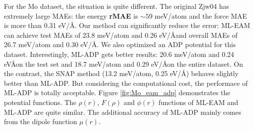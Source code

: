 \documentclass[prb,reprint,superscriptaddress]{revtex4-2}
\begin{document}
For the Mo dataset, the situation is quite different. The original Zjw04 has 
extremely large MAEs: the energy \textbf{rMAE} is $\sim 59$ meV/atom and the 
force MAE is more than 0.31 eV/\AA. Our method can significantly reduce the 
error: ML-EAM can achieve test MAEs of 23.8 meV/atom and 0.26 eV/\AA and overall
MAEs of 26.7 meV/atom and 0.30 eV/\AA. We also optimized an ADP potential for 
this dataset. Interestingly, ML-ADP gets better results: 20.6 meV/atom and 
0.24 eV\AA on the test set and 18.7 meV/atom and 0.29 eV/\AA on the entire 
dataset. On the contrast, the SNAP method (13.2 meV/atom, 0.25 eV/\AA) behaves 
slightly better than ML-ADP. But considering the computational cost, the 
performace of ML-ADP is totally acceptable. Figure \ref{fig:Mo_eam_adp} 
demonstrates the potential functions. The $\rho(r)$, $F(\rho)$ and $\phi(r)$ 
functions of ML-EAM and ML-ADP are quite similar. The additional accuracy of 
ML-ADP mainly comes from the dipole function $\mu(r)$. 
\end{document}
